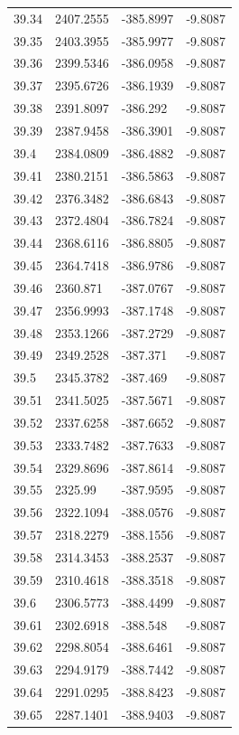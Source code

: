 \begin{table}[H]
\begin{tabular}{llll}
39.34 & 2407.2555 & -385.8997 & -9.8087 \\
39.35 & 2403.3955 & -385.9977 & -9.8087 \\
39.36 & 2399.5346 & -386.0958 & -9.8087 \\
39.37 & 2395.6726 & -386.1939 & -9.8087 \\
39.38 & 2391.8097 & -386.292 & -9.8087 \\
39.39 & 2387.9458 & -386.3901 & -9.8087 \\
39.4 & 2384.0809 & -386.4882 & -9.8087 \\
39.41 & 2380.2151 & -386.5863 & -9.8087 \\
39.42 & 2376.3482 & -386.6843 & -9.8087 \\
39.43 & 2372.4804 & -386.7824 & -9.8087 \\
39.44 & 2368.6116 & -386.8805 & -9.8087 \\
39.45 & 2364.7418 & -386.9786 & -9.8087 \\
39.46 & 2360.871 & -387.0767 & -9.8087 \\
39.47 & 2356.9993 & -387.1748 & -9.8087 \\
39.48 & 2353.1266 & -387.2729 & -9.8087 \\
39.49 & 2349.2528 & -387.371 & -9.8087 \\
39.5 & 2345.3782 & -387.469 & -9.8087 \\
39.51 & 2341.5025 & -387.5671 & -9.8087 \\
39.52 & 2337.6258 & -387.6652 & -9.8087 \\
39.53 & 2333.7482 & -387.7633 & -9.8087 \\
39.54 & 2329.8696 & -387.8614 & -9.8087 \\
39.55 & 2325.99 & -387.9595 & -9.8087 \\
39.56 & 2322.1094 & -388.0576 & -9.8087 \\
39.57 & 2318.2279 & -388.1556 & -9.8087 \\
39.58 & 2314.3453 & -388.2537 & -9.8087 \\
39.59 & 2310.4618 & -388.3518 & -9.8087 \\
39.6 & 2306.5773 & -388.4499 & -9.8087 \\
39.61 & 2302.6918 & -388.548 & -9.8087 \\
39.62 & 2298.8054 & -388.6461 & -9.8087 \\
39.63 & 2294.9179 & -388.7442 & -9.8087 \\
39.64 & 2291.0295 & -388.8423 & -9.8087 \\
39.65 & 2287.1401 & -388.9403 & -9.8087 \\

\end{tabular}
\end{table}
